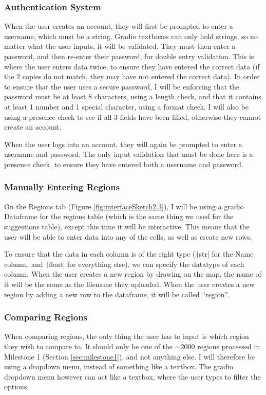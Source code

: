 \documentclass[12pt]{report}
\newcommand{\pil}[1]{\protect\texttt|#1|}
\begin{document}
\subsubsection{Authentication System}
When the user creates an account, they will first be prompted to enter a username, which must be a string. Gradio textboxes can only hold strings, so no matter what the user inputs, it will be validated. They must then enter a password, and then re-enter their password, for double entry validation. This is where the user enters data twice, to ensure they have entered the correct data (if the 2 copies do not match, they may have not entered the correct data). In order to ensure that the user uses a secure password, I will be enforcing that the password must be at least 8 characters, using a length check, and that it contains at least 1 number and 1 special character, using a format check. I will also be using a presence check to see if all 3 fields have been filled, otherwise they cannot create an account.

When the user logs into an account, they will again be prompted to enter a username and password. The only input validation that must be done here is a presence check, to ensure they have entered both a username and password.

\subsubsection{Manually Entering Regions}
On the Regions tab (Figure \ref{fig:interfaceSketch2.3}), I will be using a gradio Dataframe for the regions table (which is the same thing we used for the suggestions table), except this time it will be interactive. This means that the user will be able to enter data into any of the cells, as well as create new rows.

To ensure that the data in each column is of the right type (\pil{str} for the Name column, and \pil{float} for everything else), we can specify the datatype of each column. When the user creates a new region by drawing on the map, the name of it will be the same as the filename they uploaded. When the user creates a new region by adding a new row to the dataframe, it will be called ``region''.

\subsubsection{Comparing Regions}
When comparing regions, the only thing the user has to input is which region they wish to compare to. It should only be one of the $\sim 2000$ regions processed in Milestone 1 (Section \ref{sec:milestone1}), and not anything else. I will therefore be using a dropdown menu, instead of something like a textbox. The gradio dropdown menu however can act like a textbox, where the user types to filter the options.
\end{document}
